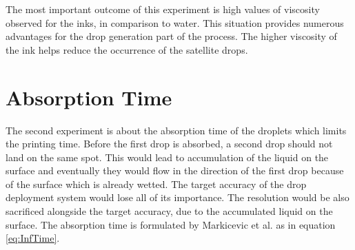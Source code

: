 The most important outcome of this experiment is high values of viscosity observed for the inks, in comparison to water. This situation provides numerous advantages for the drop generation part of the process. The higher viscosity of the ink helps reduce the occurrence of the satellite drops.

\section{Absorption Time}
The second experiment is about the absorption time of the droplets which limits the printing time. Before the first drop is absorbed, a second drop should not land on the same spot. This would lead to accumulation of the liquid on the surface and eventually they would flow in the direction of the first drop because of the surface which is already wetted. The target accuracy of the drop deployment system would lose all of its importance. The resolution would be also sacrificed alongside the target accuracy, due to the accumulated liquid on the surface. The absorption time is formulated by Markicevic et al. as in equation \ref{eq:InfTime}.

